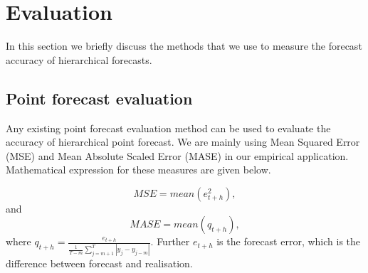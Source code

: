 \documentclass[graybox]{svmult}
\begin{document}




\section{Evaluation}

In this section we briefly discuss the methods that we use to measure the forecast accuracy of hierarchical forecasts.

\subsection{Point forecast evaluation}

Any existing point forecast evaluation method can be used to evaluate the accuracy of hierarchical point forecast. We are mainly using Mean Squared Error (MSE) and Mean Absolute Scaled Error (MASE) in our empirical application. Mathematical expression for these measures are given below.

\begin{equation}\label{eq:22}
MSE = mean(e^2_{t+h}),
\end{equation}
and
\begin{equation}\label{eq:23}
 MASE = mean(q_{t+h}),
\end{equation}
where $q_{t+h} = \frac{e_{t+h}}{\frac{1}{T-m}\sum_{j=m+1}^{T}|y_j - y_{j-m}|}$. Further $e_{t+h}$ is the forecast error, which is the difference between forecast and realisation.
\end{document}
